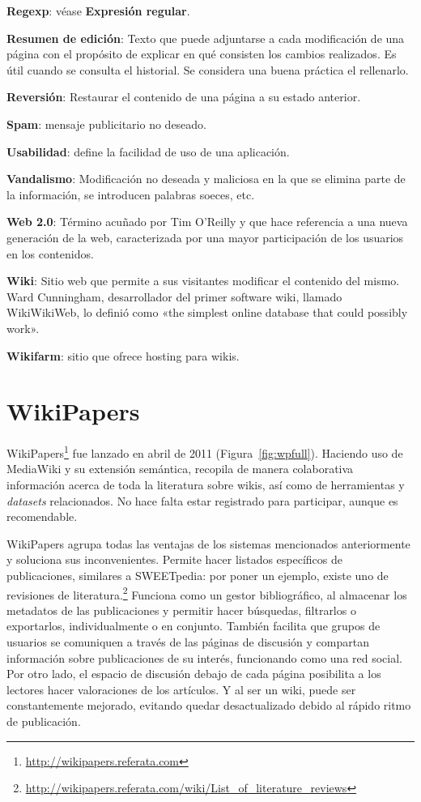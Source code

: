 \documentclass[11pt,onecolumn]{article}
\begin{document}
\textbf{Regexp}: véase \textbf{Expresión regular}.

\textbf{Resumen de edición}: Texto que puede adjuntarse a cada modificación de una página con el propósito de explicar en qué consisten los cambios realizados. Es útil cuando se consulta el historial. Se considera una buena práctica el rellenarlo.

\textbf{Reversión}: Restaurar el contenido de una página a su estado anterior.


\textbf{Spam}: mensaje publicitario no deseado.

\textbf{Usabilidad}: define la facilidad de uso de una aplicación.

\textbf{Vandalismo}: Modificación no deseada y maliciosa en la que se elimina parte de la información, se introducen palabras soeces, etc.

\textbf{Web 2.0}: Término acuñado por Tim O'Reilly y que hace referencia a una nueva generación de la web, caracterizada por una mayor participación de los usuarios en los contenidos.

\textbf{Wiki}: Sitio web que permite a sus visitantes modificar el contenido del mismo. Ward Cunningham, desarrollador del primer software wiki, llamado WikiWikiWeb, lo definió como «the simplest online database that could possibly work».

\textbf{Wikifarm}: sitio que ofrece hosting para wikis.

\clearpage

\section{WikiPapers}


WikiPapers\footnote{\href{http://wikipapers.referata.com}{http://wikipapers.referata.com}} fue lanzado en abril de 2011 (Figura~\ref{fig:wpfull}). Haciendo uso de MediaWiki y su extensión semántica, recopila de manera colaborativa información acerca de toda la literatura sobre wikis, así como de herramientas y \emph{datasets} relacionados. No hace falta estar registrado para participar, aunque es recomendable.

WikiPapers agrupa todas las ventajas de los sistemas mencionados anteriormente y soluciona sus inconvenientes. Permite hacer listados específicos de publicaciones, similares a SWEETpedia: por poner un ejemplo, existe uno de revisiones de literatura.\footnote{\href{http://wikipapers.referata.com/wiki/List_of_literature_reviews}{http://wikipapers.referata.com/wiki/List\_of\_literature\_reviews}} Funciona como un gestor bibliográfico, al almacenar los metadatos de las publicaciones y permitir hacer búsquedas, filtrarlos o exportarlos, individualmente o en conjunto. También facilita que grupos de usuarios se comuniquen a través de las páginas de discusión y compartan información sobre publicaciones de su interés, funcionando como una red social. Por otro lado, el espacio de discusión debajo de cada página posibilita a los lectores hacer valoraciones de los artículos. Y al ser un wiki, puede ser constantemente mejorado, evitando quedar desactualizado debido al rápido ritmo de publicación.
\end{document}
